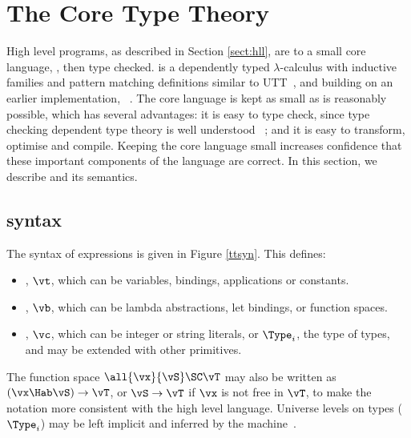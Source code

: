 \section{The Core Type Theory}

\label{sect:typechecking}

High level \Idris{} programs, as described in Section \ref{sect:hll}, are 
 to a small core language, \TT{}, then type checked. 
\TT{} is a dependently typed $\lambda$-calculus with inductive families
and pattern matching definitions similar to UTT~\cite{luo1994}, and building
on an earlier implementation, \Ivor{}~\cite{Brady2006b}.
The
core language is kept as small as is reasonably possible, which has several advantages: it is
easy to type check, since type checking dependent type theory is well understood
~\cite{loh2010tutorial}; and it is easy to transform, optimise and compile. Keeping
the core language small increases confidence that these important components of
the language are correct. In this section, we describe \TT{} and
its semantics.

\subsection{\TT{} syntax}

The syntax of \TT{} expressions is given in Figure \ref{ttsyn}. This defines:

\begin{itemize}
\item {}, $\vt$, which can be variables, bindings, applications or constants.
\item {}, $\vb$, which can be lambda abstractions, let bindings, or function spaces.
\item {}, $\vc$, which can be integer or string literals, or $\Type_i$, the
type of types, and may be extended with other primitives. 
\end{itemize}

The function space $\all{\vx}{\vS}\SC\vT$ may also be written as $(\vx\Hab\vS)\to\vT$,
or $\vS\to\vT$ if $\vx$ is not free in $\vT$, to make the notation more consistent with
the high level language. Universe levels on types ($\Type_i$) may be left implicit and
inferred by the machine~\cite{pollack1990implicit}.

